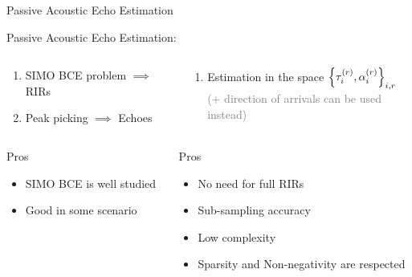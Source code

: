\begin{frame}{Passive Acoustic Echo Estimation}
\begin{block}{\alert{Passive} Acoustic Echo Estimation:}
        \vspace{.5em}
        \begin{columns}[T,onlytextwidth] %
            \begin{column}{.48\textwidth}
                \begin{enumerate}
                    \item SIMO BCE problem $\implies$ RIRs
                    \item Peak picking $\implies$ Echoes
                \end{enumerate}
            \end{column}
            \begin{column}{.48\textwidth}
                \begin{enumerate}
                    \item Estimation in the space $\kbrace{\tau_i^{(r)},\alpha_i^{(r)}}_{i,r}$
                    \\\textcolor{gray}{(+ \small direction of arrivals can be used instead)}
                \end{enumerate}
            \end{column}%
        \end{columns}
        \pause

        \vspace{1em}
        \begin{columns}[T,onlytextwidth] %
            \begin{column}{.48\textwidth}
                Pros
                \begin{itemize}
                    \item SIMO BCE is well studied %
                    \item Good in some scenario %
                \end{itemize}
            \end{column}
            \begin{column}{.48\textwidth}
                Pros
                \begin{itemize}
                    \item No need for full RIRs
                    \item Sub-sampling accuracy
                    \item Low complexity
                    \item Sparsity and Non-negativity are respected
                \end{itemize}
            \end{column}%
        \end{columns}
        \pause


\end{block}
\end{frame}

